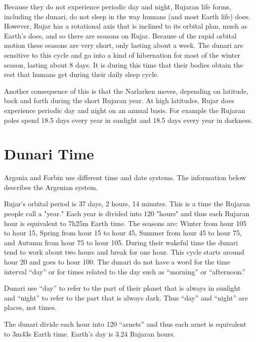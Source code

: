 Because they do not experience periodic day and night, Rujaran life forms, including the
dunari, do not sleep in the way humans (and most Earth life) does. However, Rujar has a
rotational axis that is inclined to its orbital plan, much as Earth's does, and so there are
seasons on Rujar. Because of the rapid orbital motion these seasons are very short, only
lasting about a week. The dunari are sensitive to this cycle and go into a kind of hibernation
for most of the winter season, lasting about 8 days. It is during this time that their bodies
obtain the rest that humans get during their daily sleep cycle.

Another consequence of this is that the Narlarken moves, depending on latitude, back and forth
during the short Rujaran year. At high latitudes, Rujar does experience periodic day and
night on an annual basis. For example the Rujaran poles spend 18.5 days every year in sunlight
and 18.5 days every year in darkness.


\section{Dunari Time}

Argenia and Forbin use different time and date systems. The information below describes the
Argenian system.

Rujar's orbital period is 37 days, 2 hours, 14 minutes. This is a time the Rujaran people
call a "year." Each year is divided into 120 "hours" and thus each Rujaran hour is equivalent
to 7h25m Earth time. The seasons are: Winter from hour 105 to hour 15, Spring from hour 15 to
hour 45, Summer from hour 45 to hour 75, and Autumn from hour 75 to hour 105. During their
wakeful time the dunari tend to work about two hours and break for one hour. This cycle starts
around hour 20 and goes to hour 100. The dunari do not have a word for the time interval ``day''
or for times related to the day such as ``morning'' or ``afternoon.''

Dunari use ``day'' to refer to the part of their planet that is always in sunlight and ``night''
to refer to the part that is always dark. Thus ``day'' and ``night'' are places, not times.

The dunari divide each hour into 120 ``arnets'' and thus each arnet is equivalent to 3m43s Earth
time. Earth's day is 3.24 Rujaran hours.

